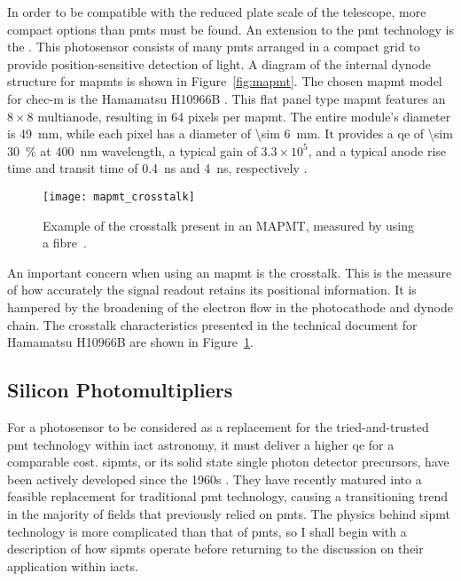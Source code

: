 In order to be compatible with the reduced plate scale of the telescope, more compact options than \glspl{pmt} must be found. An extension to the \gls{pmt} technology is the . This photosensor consists of many \glspl{pmt} arranged in a compact grid to provide position-sensitive detection of light. A diagram of the internal dynode structure for \glspl{mapmt} is shown in Figure~\ref{fig:mapmt}. The chosen \gls{mapmt} model for \gls{chec-m} is the Hamamatsu H10966B . This flat panel type \gls{mapmt} features an $8 \times 8$ multianode, resulting in 64 pixels per \gls{mapmt}. The entire module's diameter is \SI{49}{mm}, while each pixel has a diameter of \SI{\sim 6}{mm}. It provides a \gls{qe} of \SI{\sim 30}{\percent} at \SI{400}{nm} wavelength, a typical gain of $3.3 \times 10^5$, and a typical anode rise time and transit time of \SI{0.4}{ns} and \SI{4}{ns}, respectively \cite{Hamamatsu2011}. 

\begin{figure}
	\centering
    \texttt{[image: mapmt\_crosstalk]} 
	\caption[Multi-anode Photomultiplier Tube crosstalk.]{Example of the crosstalk present in an MAPMT, measured by using a fibre~\cite{Hamamatsu2011}.}
	\label{fig:mapmt_crosstalk}
\end{figure}

An important concern when using an \gls{mapmt} is the crosstalk. This is the measure of how accurately the signal readout retains its positional information. It is hampered by the broadening of the electron flow in the photocathode and dynode chain. The crosstalk characteristics presented in the technical document for Hamamatsu H10966B are shown in Figure~\ref{fig:mapmt_crosstalk}.

\subsection{Silicon Photomultipliers}

For a photosensor to be considered as a replacement for the tried-and-trusted \gls{pmt} technology within \gls{iact} astronomy, it must deliver a higher \gls{qe} for a comparable cost. \glspl{sipmt}, or its solid state single photon detector precursors, have been actively developed since the 1960s \cite{Renker2006}. They have recently matured into a feasible replacement for traditional \gls{pmt} technology, causing a transitioning trend in the majority of fields that previously relied on \glspl{pmt}. The physics behind \gls{sipmt} technology is more complicated than that of \glspl{pmt}, so I shall begin with a description of how \glspl{sipmt} operate before returning to the discussion on their application within \glspl{iact}. 

